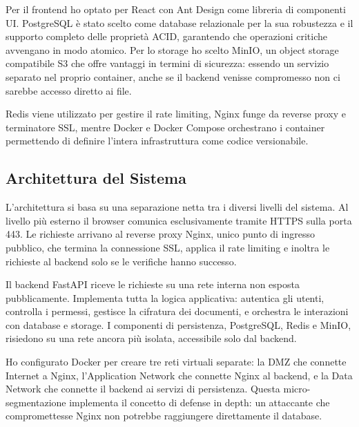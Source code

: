 \documentclass[12pt, a4paper]{article}
\begin{document}
Per il frontend ho optato per React con Ant Design come libreria di componenti UI. PostgreSQL è stato scelto come database relazionale per la sua robustezza e il supporto completo delle proprietà ACID, garantendo che operazioni critiche avvengano in modo atomico. Per lo storage ho scelto MinIO, un object storage compatibile S3 che offre vantaggi in termini di sicurezza: essendo un servizio separato nel proprio container, anche se il backend venisse compromesso non ci sarebbe accesso diretto ai file.

Redis viene utilizzato per gestire il rate limiting, Nginx funge da reverse proxy e terminatore SSL, mentre Docker e Docker Compose orchestrano i container permettendo di definire l'intera infrastruttura come codice versionabile.

\subsection{Architettura del Sistema}

L'architettura si basa su una separazione netta tra i diversi livelli del sistema. Al livello più esterno il browser comunica esclusivamente tramite HTTPS sulla porta 443. Le richieste arrivano al reverse proxy Nginx, unico punto di ingresso pubblico, che termina la connessione SSL, applica il rate limiting e inoltra le richieste al backend solo se le verifiche hanno successo.

Il backend FastAPI riceve le richieste su una rete interna non esposta pubblicamente. Implementa tutta la logica applicativa: autentica gli utenti, controlla i permessi, gestisce la cifratura dei documenti, e orchestra le interazioni con database e storage. I componenti di persistenza, PostgreSQL, Redis e MinIO, risiedono su una rete ancora più isolata, accessibile solo dal backend.

Ho configurato Docker per creare tre reti virtuali separate: la DMZ che connette Internet a Nginx, l'Application Network che connette Nginx al backend, e la Data Network che connette il backend ai servizi di persistenza. Questa micro-segmentazione implementa il concetto di defense in depth: un attaccante che compromettesse Nginx non potrebbe raggiungere direttamente il database.
\end{document}
